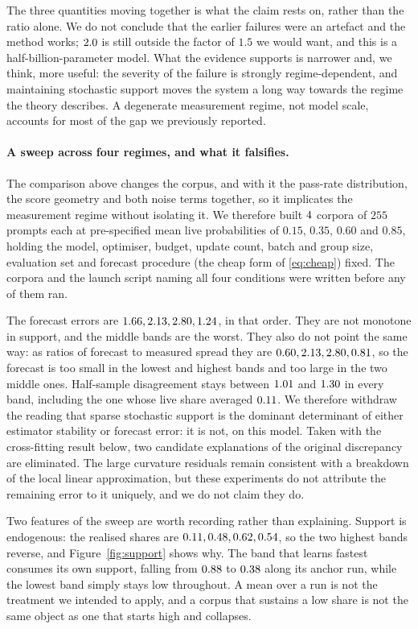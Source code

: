 The three quantities moving together is what the claim rests on, rather than the ratio alone. We
do not conclude that the earlier failures were an artefact and the method works; $2.0$
is still outside the factor of $1.5$ we would want, and this is a half-billion-parameter model.
What the evidence supports is narrower and, we think, more useful: the severity of the failure is
strongly regime-dependent, and maintaining stochastic support moves the system a long way towards
the regime the theory describes. A degenerate measurement regime, not model scale, accounts for
most of the gap we previously reported.

\paragraph{A sweep across four regimes, and what it falsifies.} The comparison above changes the
corpus, and with it the pass-rate distribution, the score geometry and both noise terms together,
so it implicates the measurement regime without isolating it. We therefore built
$4$ corpora of $255$ prompts each at pre-specified mean live probabilities of
$0.15$, $0.35$, $0.60$ and $0.85$, holding the model, optimiser, budget, update count, batch and
group size, evaluation set and forecast procedure (the cheap form of \eqref{eq:cheap}) fixed. The corpora and the launch script naming
all four conditions were written before any of them ran.

The forecast errors are $1.66, 2.13, 2.80, 1.24$, in that order. They are not monotone in support, and
the middle bands are the worst. They also do not point the same way: as ratios of forecast to
measured spread they are $0.60, 2.13, 2.80, 0.81$, so the forecast is too small in the lowest and highest
bands and too large in the two middle ones. Half-sample disagreement stays between $1.01$ and
$1.30$ in every band, including the one whose live share averaged $0.11$. We
therefore withdraw the reading that sparse stochastic support is the dominant determinant of
either estimator stability or forecast error: it is not, on this model. Taken with the
cross-fitting result below, two candidate explanations of the original discrepancy are eliminated.
The large curvature residuals remain consistent with a breakdown of the local linear approximation,
but these experiments do not attribute the remaining error to it uniquely, and we do not claim
they do.

Two features of the sweep are worth recording rather than explaining. Support is endogenous: the
realised shares are $0.11, 0.48, 0.62, 0.54$, so the two highest bands reverse, and
Figure~\ref{fig:support} shows why. The band that learns fastest consumes its own support, falling
from $0.88$ to $0.38$ along its anchor run, while the lowest band simply stays low throughout. A mean over a run is
not the treatment we intended to apply, and a corpus that sustains a low share is not the same
object as one that starts high and collapses.

